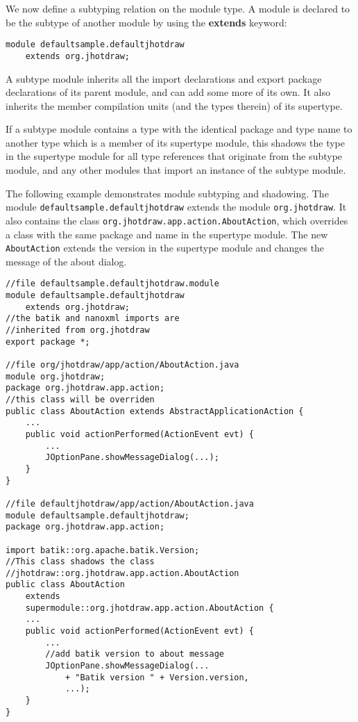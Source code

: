 We now define a subtyping relation on the module type. A module is declared
to be the subtype of another module by using the \textbf{extends} keyword:

\begin{lstlisting}
module defaultsample.defaultjhotdraw 
	extends org.jhotdraw;
\end{lstlisting}

A subtype module inherits all the import declarations and export package declarations 
of its parent module, and can add some more of its own. It also inherits the member 
compilation units (and the types therein) of its supertype.

If a subtype module contains a type with the identical package and type name
to another type which is a member of its supertype module, 
this shadows the type in the supertype module for all type references that
originate from the subtype module, and any other modules that import an
instance of the subtype module.

The following example demonstrates module subtyping and shadowing. The module
\texttt{defaultsample.defaultjhotdraw} extends the module \texttt{org.jhotdraw}. 
It also contains the class \texttt{org.jhotdraw.app.action.AboutAction},
which overrides a class with the same package and name in the supertype module.
The new \texttt{AboutAction} extends the version in the supertype module and
changes the message of the about dialog.

\begin{lstlisting}[caption=Module Subtyping]
//file defaultsample.defaultjhotdraw.module 
module defaultsample.defaultjhotdraw 
	extends org.jhotdraw;
//the batik and nanoxml imports are 
//inherited from org.jhotdraw
export package *;

//file org/jhotdraw/app/action/AboutAction.java
module org.jhotdraw;
package org.jhotdraw.app.action;
//this class will be overriden
public class AboutAction extends AbstractApplicationAction {
	...
	public void actionPerformed(ActionEvent evt) {
		...
		JOptionPane.showMessageDialog(...);
	}
}

//file defaultjhotdraw/app/action/AboutAction.java
module defaultsample.defaultjhotdraw;
package org.jhotdraw.app.action;

import batik::org.apache.batik.Version;
//This class shadows the class
//jhotdraw::org.jhotdraw.app.action.AboutAction
public class AboutAction 
	extends 
	supermodule::org.jhotdraw.app.action.AboutAction {
	...
	public void actionPerformed(ActionEvent evt) {
		...
		//add batik version to about message
		JOptionPane.showMessageDialog(...
			+ "Batik version " + Version.version,
			...);
	}
}

\end{lstlisting}

